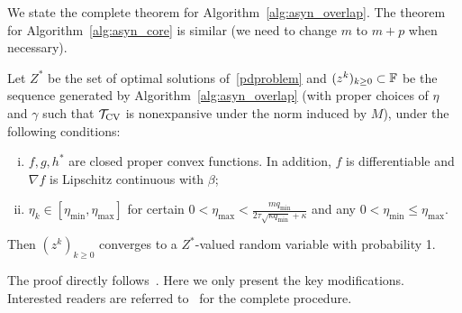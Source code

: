 We state the complete theorem for Algorithm~\ref{alg:asyn_overlap}. The theorem for Algorithm~\ref{alg:asyn_core} is similar (we need to change $m$ to $m+p$ when necessary).
\begin{thm}\label{thm:async-convergence2}
Let $Z^*$ be the set of optimal solutions of~\eqref{pdproblem} and $(z^k)_{k\geq0}\subset \mathbb{F}$ be the sequence generated by Algorithm~\ref{alg:asyn_overlap} (with proper choices of $\eta$ and $\gamma$ such that ${{\mathcal{T}}_{\textnormal{CV}}}$ is nonexpansive under the norm induced by $M$), under the following conditions:
\begin{enumerate}[(i)]
\item $f,g,h^*$ are closed proper convex functions. In addition, $f$ is differentiable and $\nabla f$ is Lipschitz continuous with $\beta$;
\item $\eta_k
\in [\eta_{\min}, \eta_{\max}]$ for certain $0<\eta_{\max}<\frac{mq_{\min}}{2\tau
\sqrt{\kappa q_{\min}}+\kappa}$ and any $0<\eta_{\min}\leq\eta_{\max}$.
\end{enumerate}
Then $(z^k)_{k\geq 0}$ converges to a $Z^*$-valued random variable with probability 1.
\end{thm}
The proof directly follows~\cite[Section 3]{Peng_2015_AROCK}. Here we only present the key modifications. Interested readers are referred to~\cite{Peng_2015_AROCK} for the complete procedure.
 
